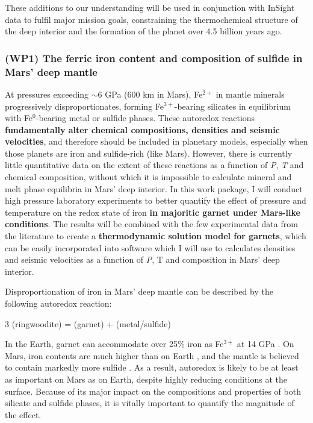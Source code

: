 \documentclass[11pt,twoside,a4paper]{article}
\begin{document}
These additions to our understanding will be used in conjunction with InSight data to fulfil major mission goals, constraining the thermochemical structure of the deep interior and the formation of the planet over 4.5 billion years ago.

\subsubsection*{(WP1) The ferric iron content and composition of sulfide in Mars' deep mantle}
At pressures exceeding $\sim$6 GPa (600 km in Mars), Fe$^{2+}$ in mantle minerals progressively disproportionates, forming Fe$^{3+}$-bearing silicates \citep[e.g.][]{Frostetal2004, Rohrbachetal2007} in equilibrium with Fe$^0$-bearing metal or sulfide phases. These autoredox reactions \textbf{fundamentally alter chemical compositions, densities and seismic velocities}, and therefore should be included in planetary models, especially when those planets are iron and sulfide-rich (like Mars). However, there is currently little quantitative data on the extent of these reactions as a function of \emph{P}, \emph{T} and chemical composition, without which it is impossible to calculate mineral and melt phase equilibria in Mars' deep interior.  In this work package, I will conduct high pressure laboratory experiments to better quantify the effect of pressure and temperature on the redox state of iron \textbf{in majoritic garnet under Mars-like conditions}. The results will be combined with the few experimental data from the literature to create a \textbf{thermodynamic solution model for garnets}, which can be easily incorporated into software which I will use to calculates densities and seismic velocities as a function of \emph{P}, T and composition in Mars' deep interior.

Disproportionation of iron in Mars' deep mantle can be described by the following autoredox reaction:
\begin{reaction}
  3  (ringwoodite) =  (garnet) +  (metal/sulfide)
\end{reaction}
In the Earth, garnet can accommodate over 25\% iron as Fe$^{3+}$ at 14 GPa \citep{Rohrbachetal2007,Rohrbachetal2011}. On Mars, iron contents are much higher than on Earth \citep[Mg\# $\sim$ 75 vs. 90;][]{WD1994}, and the mantle is believed to contain markedly more sulfide \citep[$\sim$6000 vs $<$1000 wt ppm FeS;][]{MS1995,TWW2013}. As a result, autoredox is likely to be at least as important on Mars as on Earth, despite highly reducing conditions at the surface. Because of its major impact on the compositions and properties of both silicate and sulfide phases, it is vitally important to quantify the magnitude of the effect. 
\end{document}

